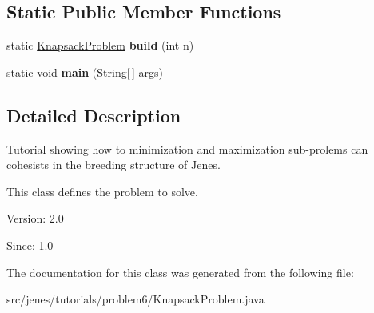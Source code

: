 \subsection*{Static Public Member Functions}
\begin{CompactItemize}
\item 
\hypertarget{classjenes_1_1tutorials_1_1problem6_1_1_knapsack_problem_a51d99e0afc8f76e96448bf45d9f412f}{
static \hyperlink{classjenes_1_1tutorials_1_1problem6_1_1_knapsack_problem}{KnapsackProblem} \textbf{build} (int n)}
\label{classjenes_1_1tutorials_1_1problem6_1_1_knapsack_problem_a51d99e0afc8f76e96448bf45d9f412f}

\item 
\hypertarget{classjenes_1_1tutorials_1_1problem6_1_1_knapsack_problem_e706a456c3248ec8360f10138d364c3e}{
static void \textbf{main} (String\mbox{[}$\,$\mbox{]} args)}
\label{classjenes_1_1tutorials_1_1problem6_1_1_knapsack_problem_e706a456c3248ec8360f10138d364c3e}

\end{CompactItemize}


\subsection{Detailed Description}
Tutorial showing how to minimization and maximization sub-prolems can cohesists in the breeding structure of Jenes.

This class defines the problem to solve.

\begin{Desc}
\item[Version:]2.0 \end{Desc}
\begin{Desc}
\item[Since:]1.0 \end{Desc}


The documentation for this class was generated from the following file:\begin{CompactItemize}
\item 
src/jenes/tutorials/problem6/KnapsackProblem.java\end{CompactItemize}
